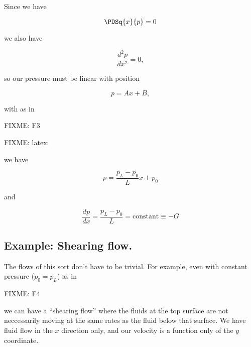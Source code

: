 Since we have

\begin{equation}\label{eqn:continuumL11:370}
\PDSq{x}{p} = 0
\end{equation}

we also have

\begin{equation}\label{eqn:continuumL11:390}
\frac{d^2 p}{dx^2} = 0,
\end{equation}

so our pressure must be linear with position

\begin{equation}\label{eqn:continuumL11:410}
p = A x + B,
\end{equation}

with as in 

FIXME: F3

FIXME: latex:

we have

\begin{equation}\label{eqn:continuumL11:450}
p = \frac{p_L - p_0}{L} x + p_0
\end{equation}

and

\begin{equation}\label{eqn:continuumL11:470}
\frac{dp}{dx} = \frac{p_L - p_0}{L} = \text{constant} \equiv -G
\end{equation}

\subsection{Example: Shearing flow.}

The flows of this sort don't have to be trivial.  For example, even with constant pressure ($p_0 = p_L$) as in

FIXME: F4

we can have a ``shearing flow'' where the fluids at the top surface are not neccessarily moving at the same rates as the fluid below that surface.  We have fluid flow in the $x$ direction only, and our velocity is a function only of the $y$ coordinate.

